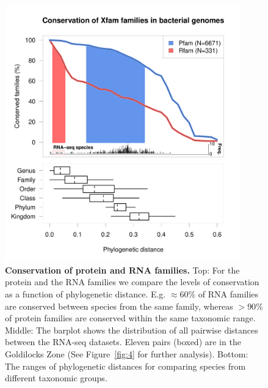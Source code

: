 \documentclass[10pt]{article}
\begin{document}
\begin{figure}[!ht]
\begin{center}
\includegraphics[width=4in]{figures/figure3.pdf}
\end{center}
\caption{ {\bf Conservation of protein and RNA families.} Top: For the
  protein and the RNA families we compare the levels of conservation
  as a function of phylogenetic distance. E.g. $\approx 60\%$ of RNA
  families are conserved between species from the same family, whereas
  $>90\%$ of protein families are conserved within the same taxonomic
  range.  Middle: The barplot shows the distribution of all pairwise
  distances between the RNA-seq datasets. Eleven pairs (boxed) are in
  the Goldilocks Zone (See Figure~\ref{fig:4} for further
  analysis). Bottom: The ranges of phylogenetic distances for
  comparing species from different taxonomic groups.}
\label{fig:3}
\end{figure}



\end{document}

